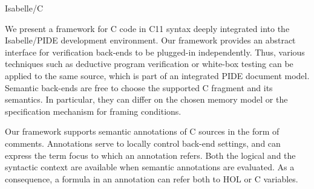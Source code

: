 %
\begin{isabellebody}%
%
%
\isadelimtheory
%
\endisadelimtheory
%
\isatagtheory
%
\endisatagtheory
{\isafoldtheory}%
%
\isadelimtheory
%
\endisadelimtheory
%
\isadelimML
%
\endisadelimML
%
\isatagML
%
\endisatagML
{\isafoldML}%
%
\isadelimML
%
\endisadelimML
%
\begin{isamarkuptitle*}%
[label = {tit},type = {scholarly_paper.title}, args={label = {tit},type = {scholarly_paper.title}, scholarly_paper.title.short_title = {}}]Isabelle/C%
\end{isamarkuptitle*}\isamarkuptrue%
%
\begin{isamarkuptext*}%
[label = {abs},type = {scholarly_paper.abstract}, args={label = {abs},type = {scholarly_paper.abstract}, scholarly_paper.abstract.keywordlist = {{User Interface, Integrated Development, Program Verification, Shallow Embedding}}}]We present a framework for C code in C11 syntax deeply integrated into the Isabelle/PIDE
  development environment. Our framework provides an abstract interface for verification back-ends
  to be plugged-in independently. Thus, various techniques such as deductive program verification or
  white-box testing can be applied to the same source, which is part of an integrated PIDE document
  model. Semantic back-ends are free to choose the supported C fragment and its semantics. In
  particular, they can differ on the chosen memory model or the specification mechanism
  for framing conditions.

  Our framework supports semantic annotations of C sources in the form of comments. Annotations
  serve to locally control back-end settings, and can express the term focus to which
  an annotation refers. Both the logical and the syntactic context are available when semantic
  annotations are evaluated. As a consequence, a formula in an annotation can refer both 
  to  HOL or C variables.


\end{isamarkuptext*}
\end{isabellebody}
